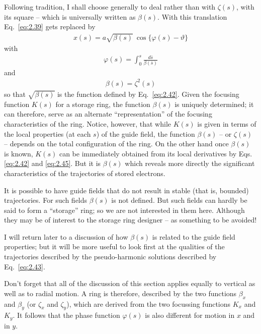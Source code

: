Following tradition, I shall choose generally to deal rather than with $\zeta(s)$, with its square -- which is universally written as $\beta(s)$. With this translation Eq.~\eqref{eq:2.39} gets replaced by
\begin{align}
	x(s) = a\sqrt{\beta(s)}\ \cos\{\varphi(s)-\vartheta\}\label{eq:2.43}
\end{align}
with
\begin{align}
	\varphi(s) = \int_{0}^{s} \frac{d\bar{s}}{\beta(\bar{s})}\label{eq:2.44}
\end{align}
and
\begin{align}
	\beta(s) = \zeta^2(s)\label{eq:2.45}
\end{align}
so that $\sqrt{\beta(s)}$ is the function defined by Eq.~\eqref{eq:2.42}. Given the focusing function $K(s)$ for a storage ring, the function $\beta(s)$ is uniquely determined; it can therefore, serve as an alternate “representation” of the focusing characteristics of the ring. Notice, however, that while $K(s)$ is given in terms of the local properties (at each $s$) of the guide field, the function
$\beta(s)$ -- or $\zeta(s)$ -- depends on the total configuration of the ring. On the other hand once $\beta(s)$ is known, $K(s)$ can be immediately obtained from its local derivatives by Eqs. \eqref{eq:2.42} and \eqref{eq:2.45}. But it is $\beta(s)$ which reveals more directly the significant characteristics of the trajectories of stored electrons.

It is possible to have guide fields that do not result in stable (that is, bounded) trajectories. For such fields $\beta(s)$ is not defined. But such fields can hardly be said to form a ``storage'' ring; so we are not interested in them here. Although they may be of interest to the storage ring designer -- as something to be avoided!

I will return later to a discussion of how $\beta(s)$ is related to the guide field properties; but it will be more useful to look first at the qualities of the trajectories described by the pseudo-harmonic solutions described by Eq.~\ref{eq:2.43}.

Don't forget that all of the discussion of this section applies equally to vertical as well as to radial motion. A ring is therefore, described by the two functions $\beta_x$ and $\beta_y$ (or $\zeta_x$ and $\zeta_y$), which are derived from the two focussing functions $K_x$ and $K_y$. It follows that the phase function $\varphi(s)$ is also different for motion in $x$ and in $y$.
